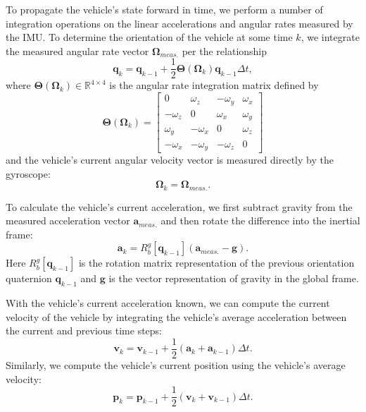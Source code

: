 To propagate the vehicle's state forward in time, we perform a number of integration operations on the linear accelerations and angular rates measured by the IMU. To determine the orientation of the vehicle at some time $k$, we integrate the measured angular rate vector $\bm{\Omega}_{meas.}$ per the relationship
%
\begin{equation} \label{eq:proc_quat}
\mathbf{q}_{k} = \mathbf{q}_{k-1} + \frac{1}{2} \mathbf{\Theta} \left( \bm{\Omega}_{k} \right) \mathbf{q}_{k-1} \Delta t ,
\end{equation}
%
where $\mathbf{\Theta} \left( \bm{\Omega}_{k} \right) \in \mathbb{R}^{4 \times 4}$ is the angular rate integration matrix defined by
%
\begin{equation}
\mathbf{\Theta} \left( \bm{\Omega}_{k} \right) =
\begin{bmatrix}
0 & \omega_{z} & -\omega_{y} & \omega_{x} \\
-\omega_{z} & 0 & \omega_{x} & \omega_{y} \\
\omega_{y} & -\omega_{x} & 0 & \omega_{z} \\
-\omega_{x} & -\omega_{y} & -\omega_{z} & 0
\end{bmatrix}
\end{equation}
%
and the vehicle's current angular velocity vector is measured directly by the gyroscope:
%
\begin{equation} \label{eq:proc_ang_vel}
\bm{\Omega}_{k} = \bm{\Omega}_{meas.} .
\end{equation}

To calculate the vehicle's current acceleration, we first subtract gravity from the measured acceleration vector $\mathbf{a}_{meas.}$ and then rotate the difference into the inertial frame: 
%
\begin{equation} \label{eq:proc_acc}
\mathbf{a}_{k} = R^{g}_{b} \left[ \mathbf{q}_{k-1} \right] \left( \mathbf{a}_{meas.} - \mathbf{g} \right) .
\end{equation}
%
Here $R^{g}_{b} \left[ \mathbf{q}_{k-1} \right]$ is the rotation matrix representation of the previous orientation quaternion $\mathbf{q}_{k-1}$ and $\mathbf{g}$ is the vector representation of gravity in the global frame. 

With the vehicle's current acceleration known, we can compute the current velocity of the vehicle by integrating the vehicle's average acceleration between the current and previous time steps:
%
\begin{equation} \label{eq:proc_vel}
\mathbf{v}_{k} = \mathbf{v}_{k-1} + \frac{1}{2} \left( \mathbf{a}_{k} + \mathbf{a}_{k-1} \right) \Delta t .
\end{equation}
%
Similarly, we compute the vehicle's current position using the vehicle's average velocity:
%
\begin{equation} \label{eq:proc_pos}
\mathbf{p}_{k} = \mathbf{p}_{k-1} + \frac{1}{2} \left( \mathbf{v}_{k} + \mathbf{v}_{k-1} \right) \Delta t .
\end{equation}


